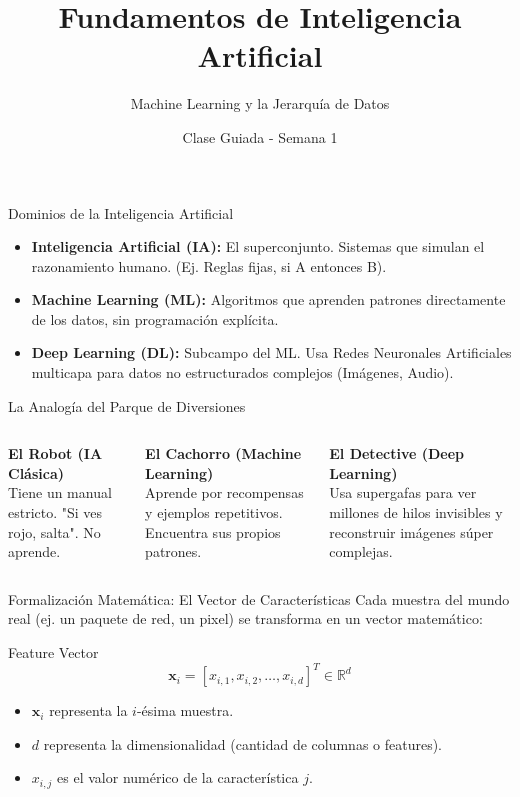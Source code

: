 \documentclass[aspectratio=169]{beamer}
\title{Fundamentos de Inteligencia Artificial}
\subtitle{Machine Learning y la Jerarquía de Datos}
\author{Clase Guiada - Semana 1}
\date{}
\begin{document}
\begin{frame}
    \titlepage
\end{frame}

\begin{frame}{Dominios de la Inteligencia Artificial}
    \begin{itemize}
        \item \textbf{Inteligencia Artificial (IA):} El superconjunto. Sistemas que simulan el razonamiento humano. (Ej. Reglas fijas, si A entonces B).
        \item \textbf{Machine Learning (ML):} Algoritmos que aprenden patrones directamente de los datos, sin programación explícita.
        \item \textbf{Deep Learning (DL):} Subcampo del ML. Usa Redes Neuronales Artificiales multicapa para datos no estructurados complejos (Imágenes, Audio).
    \end{itemize}
\end{frame}

\begin{frame}{La Analogía del Parque de Diversiones}
    \begin{columns}
        \textbf{El Robot (IA Clásica)} \\
        Tiene un manual estricto. "Si ves rojo, salta". No aprende.
        \vspace{0.5cm}
        
        \textbf{El Cachorro (Machine Learning)} \\
        Aprende por recompensas y ejemplos repetitivos. Encuentra sus propios patrones.
        
        \textbf{El Detective (Deep Learning)} \\
        Usa supergafas para ver millones de hilos invisibles y reconstruir imágenes súper complejas.
    \end{columns}
\end{frame}

\begin{frame}{Formalización Matemática: El Vector de Características}
    Cada muestra del mundo real (ej. un paquete de red, un pixel) se transforma en un vector matemático:
    
    \begin{block}{Feature Vector}
    $$\mathbf{x}_i = [x_{i,1}, x_{i,2}, \dots, x_{i,d}]^T \in \mathbb{R}^d$$
    \end{block}
    
    \begin{itemize}
        \item $\mathbf{x}_i$ representa la $i$-ésima muestra.
        \item $d$ representa la dimensionalidad (cantidad de columnas o features).
        \item $x_{i,j}$ es el valor numérico de la característica $j$.
    \end{itemize}
\end{frame}
\end{document}
